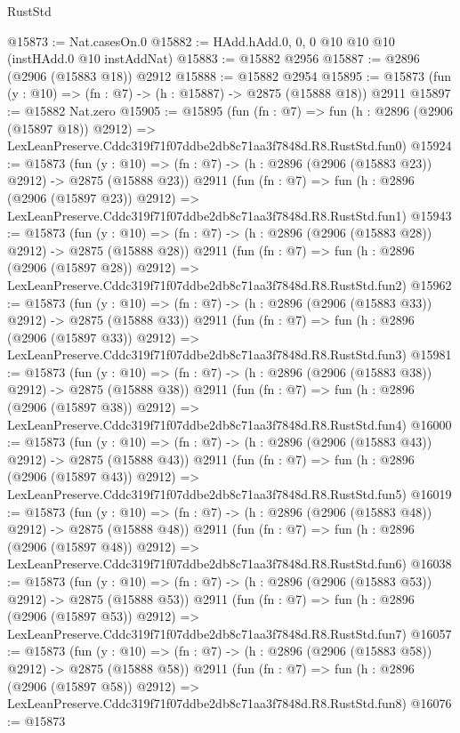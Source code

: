 \begin{lexlean}{RustStd}
\begin{coremodule}
@15873 := Nat.casesOn.{0}
@15882 := HAdd.hAdd.{0, 0, 0} @10 @10 @10 (instHAdd.{0} @10 instAddNat)
@15883 := @15882 @2956
@15887 := @2896 (@2906 (@15883 @18)) @2912
@15888 := @15882 @2954
@15895 := @15873 (fun (y : @10) => (fn : @7) -> (h : @15887) -> @2875 (@15888 @18)) @2911
@15897 := @15882 Nat.zero
@15905 := @15895
    (fun (fn : @7) =>
    fun (h : @2896 (@2906 (@15897 @18)) @2912) =>
    LexLeanPreserve.Cddc319f71f07ddbe2db8c71aa3f7848d.R8.RustStd.fun0)
@15924 := @15873
    (fun (y : @10) => (fn : @7) -> (h : @2896 (@2906 (@15883 @23)) @2912) -> @2875 (@15888 @23))
    @2911
    (fun (fn : @7) =>
    fun (h : @2896 (@2906 (@15897 @23)) @2912) =>
    LexLeanPreserve.Cddc319f71f07ddbe2db8c71aa3f7848d.R8.RustStd.fun1)
@15943 := @15873
    (fun (y : @10) => (fn : @7) -> (h : @2896 (@2906 (@15883 @28)) @2912) -> @2875 (@15888 @28))
    @2911
    (fun (fn : @7) =>
    fun (h : @2896 (@2906 (@15897 @28)) @2912) =>
    LexLeanPreserve.Cddc319f71f07ddbe2db8c71aa3f7848d.R8.RustStd.fun2)
@15962 := @15873
    (fun (y : @10) => (fn : @7) -> (h : @2896 (@2906 (@15883 @33)) @2912) -> @2875 (@15888 @33))
    @2911
    (fun (fn : @7) =>
    fun (h : @2896 (@2906 (@15897 @33)) @2912) =>
    LexLeanPreserve.Cddc319f71f07ddbe2db8c71aa3f7848d.R8.RustStd.fun3)
@15981 := @15873
    (fun (y : @10) => (fn : @7) -> (h : @2896 (@2906 (@15883 @38)) @2912) -> @2875 (@15888 @38))
    @2911
    (fun (fn : @7) =>
    fun (h : @2896 (@2906 (@15897 @38)) @2912) =>
    LexLeanPreserve.Cddc319f71f07ddbe2db8c71aa3f7848d.R8.RustStd.fun4)
@16000 := @15873
    (fun (y : @10) => (fn : @7) -> (h : @2896 (@2906 (@15883 @43)) @2912) -> @2875 (@15888 @43))
    @2911
    (fun (fn : @7) =>
    fun (h : @2896 (@2906 (@15897 @43)) @2912) =>
    LexLeanPreserve.Cddc319f71f07ddbe2db8c71aa3f7848d.R8.RustStd.fun5)
@16019 := @15873
    (fun (y : @10) => (fn : @7) -> (h : @2896 (@2906 (@15883 @48)) @2912) -> @2875 (@15888 @48))
    @2911
    (fun (fn : @7) =>
    fun (h : @2896 (@2906 (@15897 @48)) @2912) =>
    LexLeanPreserve.Cddc319f71f07ddbe2db8c71aa3f7848d.R8.RustStd.fun6)
@16038 := @15873
    (fun (y : @10) => (fn : @7) -> (h : @2896 (@2906 (@15883 @53)) @2912) -> @2875 (@15888 @53))
    @2911
    (fun (fn : @7) =>
    fun (h : @2896 (@2906 (@15897 @53)) @2912) =>
    LexLeanPreserve.Cddc319f71f07ddbe2db8c71aa3f7848d.R8.RustStd.fun7)
@16057 := @15873
    (fun (y : @10) => (fn : @7) -> (h : @2896 (@2906 (@15883 @58)) @2912) -> @2875 (@15888 @58))
    @2911
    (fun (fn : @7) =>
    fun (h : @2896 (@2906 (@15897 @58)) @2912) =>
    LexLeanPreserve.Cddc319f71f07ddbe2db8c71aa3f7848d.R8.RustStd.fun8)
@16076 := @15873

\end{coremodule}
\end{lexlean}
